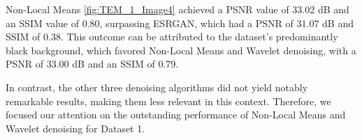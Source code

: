 \vspace{10pt}

Non-Local Means \ref{fig:TEM_1_Image4} achieved a PSNR value of 33.02 dB and an SSIM value of 0.80, surpassing ESRGAN, which had a PSNR of 31.07 dB and SSIM of 0.38. This outcome can be attributed to the dataset's predominantly black background, which favored Non-Local Means and Wavelet denoising, with a PSNR of 33.00 dB and an SSIM of 0.79.

\vspace{10pt}

In contrast, the other three denoising algorithms did not yield notably remarkable results, making them less relevant in this context. Therefore, we focused our attention on the outstanding performance of Non-Local Means and Wavelet denoising for Dataset 1.


